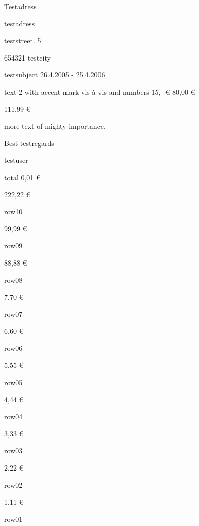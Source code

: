 \documentclass[11pt,a4paper]{article}
\begin{document}
Testadress

testadress

teststreet. 5

654321 testcity

testsubject 26.4.2005 - 25.4.2006

text 2 with accent mark vis-à-vis and numbers 15,- € 80,00 €

111,99 €

more text of mighty importance.

Best testregards

testuser

total 0,01 €

222,22 €

row10

99,99 €

row09

88,88 €

row08

7,70 €

row07

6,60 €

row06

5,55 €

row05

4,44 €

row04

3,33 €

row03

2,22 €

row02

1,11 €

row01
\end{document}
